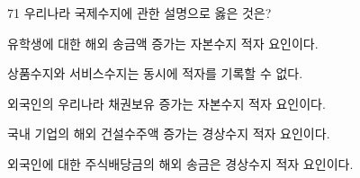 \begin{question}{71}
우리나라 국제수지에 관한 설명으로 옳은 것은?
\begin{choices}
  \item 유학생에 대한 해외 송금액 증가는 자본수지 적자 요인이다.
  \item 상품수지와 서비스수지는 동시에 적자를 기록할 수 없다.
  \item 외국인의 우리나라 채권보유 증가는 자본수지 적자 요인이다.
  \item 국내 기업의 해외 건설수주액 증가는 경상수지 적자 요인이다.
  \item 외국인에 대한 주식배당금의 해외 송금은 경상수지 적자 요인이다.
\end{choices}
\end{question}

